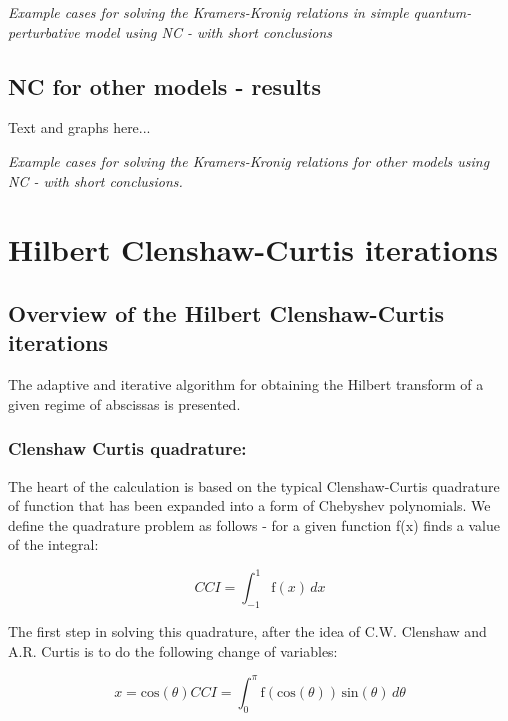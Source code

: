 \documentclass[12pt,twoside,a4paper]{article}
\def\emptyline{\vspace{12pt}}
\numberwithin{equation}{subsection}
\numberwithin{figure}{subsection}
\begin{document}
\emptyline

\textit{Example cases for solving the Kramers-Kronig relations in simple quantum-perturbative model using NC - with short
conclusions}

\subsection{NC for other models - results} \label{chap:nc_other}

Text and graphs here... 

\textit{Example cases for solving the Kramers-Kronig relations for other models using NC - with short conclusions.}

\section{Hilbert Clenshaw-Curtis iterations} \label{chap:hcc}

\subsection{Overview of the Hilbert Clenshaw-Curtis iterations} \label{chap:hcc_overview}

The adaptive and iterative algorithm for obtaining the Hilbert transform of a given regime of abscissas is presented. 

\subsubsection*{Clenshaw Curtis quadrature: }

The heart of the calculation is based on the typical Clenshaw-Curtis quadrature of function that has been expanded into a form of
Chebyshev polynomials. We define the quadrature problem as follows - for a given function f(x) finds a value of the integral:

\begin{equation} \label{eq:cci_equation}
  CCI = \int_{ - 1}^{1}\mathrm{f}(x)\,dx
\end{equation}

The first step in solving this quadrature, after the idea of C.W. Clenshaw and A.R. Curtis \cite{clenshaw_method} is to do the
following change of variables:

\begin{subequations} \label{eq:cci_variables}
  \begin{equation} \label{eq:ccivars_x}
    x=\mathrm{cos}(\theta ) 
  \end{equation}
  \begin{equation} \label{eq:ccivars_cci}
    CCI = \int_{0}^{\pi }\mathrm{f}(\mathrm{cos}(\theta ))\,\mathrm{sin}( \theta )\,d\theta  
  \end{equation}
\end{subequations} 
 
\end{document}
